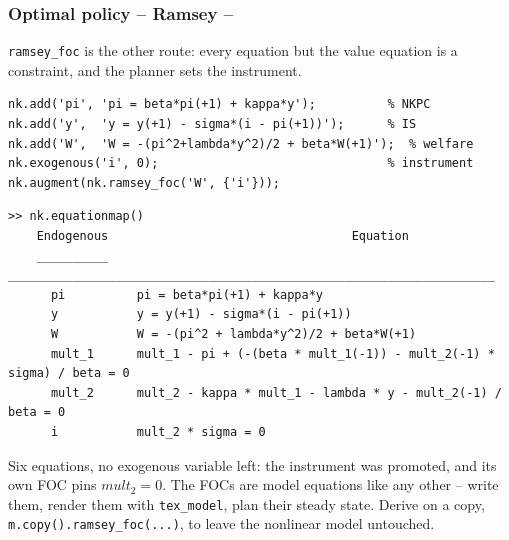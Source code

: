 \documentclass[10pt,slidestop]{beamer}
\theoremstyle{plain}
\begin{document}
\begin{frame}[c,fragile]
  \frametitle{Optimal policy -- Ramsey --}

  \verb+ramsey_foc+ is the other route: every equation but the value equation is a
  constraint, and the planner sets the instrument.

  \begin{lstlisting}[style=MatlabConsole,basicstyle=\ttfamily\scriptsize]
nk.add('pi', 'pi = beta*pi(+1) + kappa*y');          % NKPC
nk.add('y',  'y = y(+1) - sigma*(i - pi(+1))');      % IS
nk.add('W',  'W = -(pi^2+lambda*y^2)/2 + beta*W(+1)');  % welfare
nk.exogenous('i', 0);                                % instrument
nk.augment(nk.ramsey_foc('W', {'i'}));
  \end{lstlisting}

  \begin{lstlisting}[style=MatlabConsole,basicstyle=\ttfamily\tiny]
>> nk.equationmap()
    Endogenous                                  Equation
    __________    ____________________________________________________________________
      pi          pi = beta*pi(+1) + kappa*y
      y           y = y(+1) - sigma*(i - pi(+1))
      W           W = -(pi^2 + lambda*y^2)/2 + beta*W(+1)
      mult_1      mult_1 - pi + (-(beta * mult_1(-1)) - mult_2(-1) * sigma) / beta = 0
      mult_2      mult_2 - kappa * mult_1 - lambda * y - mult_2(-1) / beta = 0
      i           mult_2 * sigma = 0
  \end{lstlisting}

  \small Six equations, no exogenous variable left: the instrument was promoted, and its
  own FOC pins $mult_2 = 0$. The FOCs are model equations like any other -- write them,
  render them with \verb+tex_model+, plan their steady state. Derive on a copy,
  \verb+m.copy().ramsey_foc(...)+, to leave the nonlinear model untouched.

\end{frame}

\end{document}
